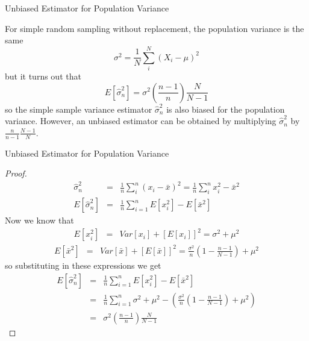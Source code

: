 \documentclass{beamer}
\numberwithin{equation}{section}
\begin{document}
\begin{frame}{Unbiased Estimator for Population Variance}
\scriptsize

\begin{theorem}

For simple random sampling without replacement, the population variance is the same
$$
\sigma^2 = \frac{1}{N}   \sum_i^N (X_i-\mu)^2
$$
but it turns out that 
$$
E[\hat{\sigma}_n^2]=\sigma^2 \left( \frac{n-1}{n} \right) \frac{ N}{N-1}
$$
so the simple sample variance estimator $\hat{\sigma}_n^2$ is also biased for the population variance. However, an unbiased estimator can be obtained by multiplying $\hat{\sigma}_n^2$ by $\frac{n}{n-1} \frac{N-1}{N}$.%
\end{theorem}
\end{frame}

\begin{frame}{Unbiased Estimator for Population Variance}
\tiny
\begin{proof}
\begin{eqnarray}
\hat{\sigma}_n^2 &=&  \frac{1}{n}   \sum_i^n (x_i-\bar{x})^2  =  \frac{1}{n}   \sum_i^n x_i^2 - \bar{x}^2  \\ 
E[\hat{\sigma}_n^2 ]  & =& \frac{1}{n}  \sum_{i=1}^n  E[ x_i^2] - E[\bar{x}^2] 
\end{eqnarray}
Now we know that 
\begin{eqnarray}
E[x_i^2] &=& Var[x_i] + [E[x_i]]^2  = \sigma^2 + \mu^2  
\end{eqnarray}\vspace{-.1in}
\begin{eqnarray}
E[\bar{x}^2] &=& Var[\bar{x}] + [E[\bar{x}]]^2  = \frac{\sigma^2}{n} \left(1- \frac{n-1}{N-1} \right)   + \mu^2   
\end{eqnarray}
so substituting in these expressions we get
\begin{eqnarray}
E[\hat{\sigma}_n^2 ]  &=& \frac{1}{n}  \sum_{i=1}^n  E[ x_i^2] - E[\bar{x}^2] \\ 
 &=& \frac{1}{n}  \sum_{i=1}^n \sigma^2 + \mu^2  - \left( \frac{\sigma^2}{n} \left(1- \frac{n-1}{N-1} \right)   + \mu^2 \right)   \\ 
 & =& \sigma^2 \left( \frac{n-1}{n} \right) \frac{ N}{N-1}  
\end{eqnarray}
\end{proof}
\end{frame}
\end{document}
